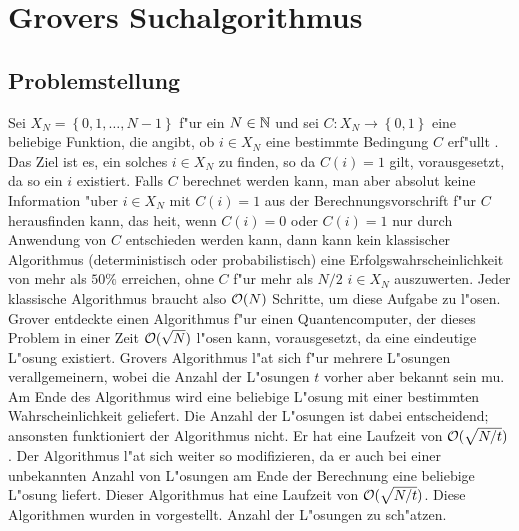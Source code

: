  \section{Grovers Suchalgorithmus} 
  \subsection{Problemstellung} 
    Sei $X_N=\left\{0,1,\ldots ,N-1\right\}$ f"ur ein $N\in \mathbb{N}$ und sei $C:X_N \to \left\{ 0,1\right\}$ eine beliebige 
    Funktion, die angibt, ob $i\in X_N$ eine bestimmte Bedingung $C$ erf"ullt . Das Ziel ist es, ein solches $i\in X_N$ zu finden, 
    so da\3 $C\left(i\right)=1$ gilt, vorausgesetzt, da\3 so ein $i$ existiert. Falls $C$ berechnet werden kann, man aber absolut keine
    Information "uber $i\in X_N$ mit $C(i)=1$ aus der Berechnungsvorschrift f"ur $C$ herausfinden kann, das hei\3t, wenn $C(i)=0$ oder $C(i)=1$ nur durch
    Anwendung von $C$ entschieden werden kann, dann kann kein klassischer Algorithmus (deterministisch oder probabilistisch) eine Erfolgswahrscheinlichkeit 
    von mehr als $50\%$ erreichen, ohne $C$ f"ur mehr als $N/2$ $i\in X_N$ auszuwerten. Jeder klassische 
    Algorithmus braucht also ${\cal O}(N)$ Schritte, um diese Aufgabe zu l"osen. Grover \cite{grosuch} entdeckte einen Algorithmus f"ur  
    einen Quantencomputer, der dieses Problem in einer Zeit ${\cal O}(\sqrt{ N})$ l"osen kann, vorausgesetzt, da\3 eine  
    eindeutige L"osung existiert. Grovers Algorithmus l"a\3t sich f"ur mehrere L"osungen verallgemeinern, wobei die Anzahl der L"osungen $t$ vorher aber
    bekannt sein mu\3. Am Ende des Algorithmus wird eine beliebige L"osung mit einer bestimmten Wahrscheinlichkeit geliefert. Die Anzahl der L"osungen ist
    dabei entscheidend; ansonsten funktioniert der Algorithmus nicht. Er hat eine Laufzeit von ${\cal O}(\sqrt{N/t})$. Der Algorithmus l"a\3t sich weiter
    so modifizieren, da\3 er auch bei einer unbekannten Anzahl von L"osungen am Ende der Berechnung eine beliebige L"osung liefert. Dieser Algorithmus
    hat eine Laufzeit von ${\cal O}(\sqrt{N/t})$. Diese Algorithmen wurden in \cite{hoyer} vorgestellt.
    Anzahl der L"osungen zu sch"atzen.

